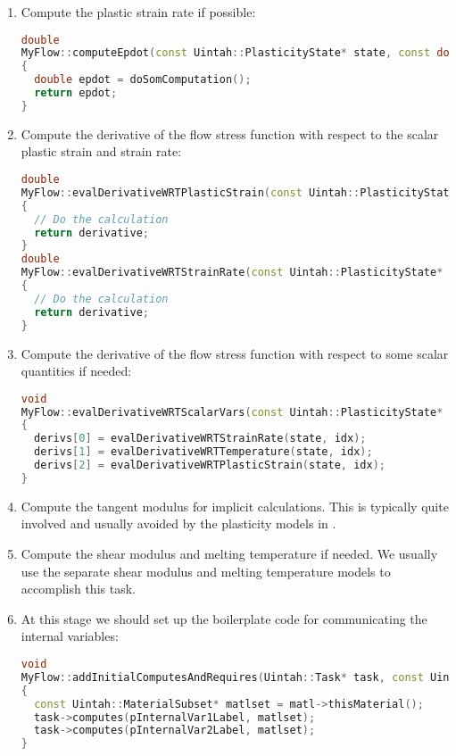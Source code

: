 \begin{enumerate}
\begin{lstlisting}[language=Cpp]
  // Update the internal variables if needed
  pInternalVar1_new[idx] = internalVar1;
  pInternalVar2_new[idx] = internalVar2;

  return flowStress;
}
\end{lstlisting}

  \item Compute the plastic strain rate if possible:
\begin{lstlisting}[language=Cpp]
double
MyFlow::computeEpdot(const Uintah::PlasticityState* state, const double& delT, const double&, const Uintah::MPMMaterial*, const Uintah::particleIndex pidx)
{
  double epdot = doSomComputation();
  return epdot;
}
\end{lstlisting}

  \item Compute the derivative of the flow stress function with respect to the scalar plastic
        strain and strain rate:
\begin{lstlisting}[language=Cpp]
double
MyFlow::evalDerivativeWRTPlasticStrain(const Uintah::PlasticityState* state, const Uintah::particleIndex idx)
{
  // Do the calculation
  return derivative;
}
double
MyFlow::evalDerivativeWRTStrainRate(const Uintah::PlasticityState* state, const Uintah::particleIndex idx)
{
  // Do the calculation
  return derivative;
}
\end{lstlisting}

  \item Compute the derivative of the flow stress function with respect to some scalar
        quantities if needed:
\begin{lstlisting}[language=Cpp]
void
MyFlow::evalDerivativeWRTScalarVars(const Uintah::PlasticityState* state, const Uintah::particleIndex idx, Uintah::Vector& derivs)
{
  derivs[0] = evalDerivativeWRTStrainRate(state, idx);
  derivs[1] = evalDerivativeWRTTemperature(state, idx);
  derivs[2] = evalDerivativeWRTPlasticStrain(state, idx);
}
\end{lstlisting}

  \item Compute the tangent modulus for implicit calculations. This is typically quite 
        involved and usually avoided by the plasticity models in \Vaango.

  \item Compute the shear modulus and melting temperature if needed.  We usually use
        the separate shear modulus and melting temperature models to accomplish this task.

  \item At this stage we should set up the boilerplate code for communicating the 
        internal variables:
\begin{lstlisting}[language=Cpp]
void
MyFlow::addInitialComputesAndRequires(Uintah::Task* task, const Uintah::MPMMaterial* matl, const PatchSet*)
{
  const Uintah::MaterialSubset* matlset = matl->thisMaterial();
  task->computes(pInternalVar1Label, matlset);
  task->computes(pInternalVar2Label, matlset);
}


\end{lstlisting}
\end{enumerate}
